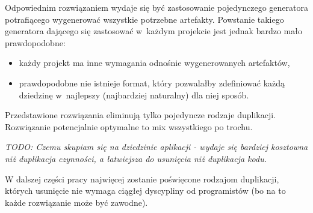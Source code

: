 Odpowiednim rozwiązaniem wydaje się być zastosowanie pojedynczego generatora potrafiącego wygenerować wszystkie potrzebne artefakty.
Powstanie takiego generatora dającego się zastosować w~każdym projekcie jest jednak bardzo mało prawdopodobne:

\begin{itemize}
 \item każdy projekt ma inne wymagania odnośnie wygenerowanych artefaktów,
 \item prawdopodobne nie istnieje format, który pozwalałby zdefiniować każdą dziedzinę w~najlepszy (najbardziej naturalny) dla niej sposób.
\end{itemize}



Przedstawione rozwiązania eliminują tylko pojedyncze rodzaje duplikacji.
Rozwiązanie potencjalnie optymalne to mix wszystkiego po trochu.

\emph{TODO: Czemu skupiam się na dziedzinie aplikacji - wydaje się bardziej kosztowna niż duplikacja czynności, a łatwiejsza do usunięcia niż duplikacja kodu.}

W dalszej części pracy najwięcej zostanie poświęcone rodzajom duplikacji, których usunięcie nie wymaga ciągłej dyscypliny od programistów (bo na to każde rozwiązanie może być zawodne).
